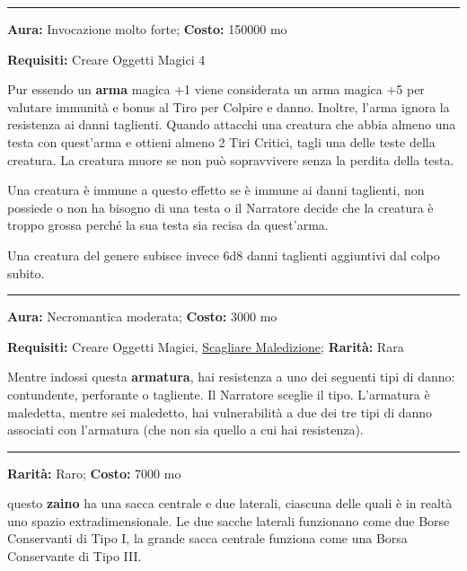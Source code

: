 \begin{multicols}{2}
\smallskip\noindent\rule{\linewidth}{2pt}  \hypertarget{Vorpal}{}\smallskip{}\noindent\label{Vorpal}

\textbf{Aura:} Invocazione molto forte; \textbf{Costo:} 150000 mo

\textbf{Requisiti:} Creare Oggetti Magici 4

Pur essendo un \textbf{arma} magica +1 viene considerata un arma magica +5 per valutare immunità e bonus al Tiro per Colpire e danno. Inoltre, l'arma ignora la resistenza ai danni taglienti. Quando attacchi una creatura che abbia almeno una testa con quest'arma e ottieni almeno 2 Tiri Critici, tagli una delle teste della creatura. La creatura muore se non può sopravvivere senza la perdita della testa.

Una creatura è immune a questo effetto se è immune ai danni taglienti, non possiede o non ha bisogno di una testa o il Narratore decide che la creatura è troppo grossa perché la sua testa sia recisa da quest'arma.

Una creatura del genere subisce invece 6d8 danni taglienti aggiuntivi dal colpo subito.

\smallskip\noindent\rule{\linewidth}{2pt}  \hypertarget{Vulnerabilità}{}\smallskip{}\noindent\label{Vulnerabilità}

\textbf{Aura:} Necromantica moderata; \textbf{Costo:} 3000 mo

\textbf{Requisiti:} Creare Oggetti Magici, \hyperlink{Scagliare Maledizione}{Scagliare Maledizione}; \textbf{Rarità:} Rara

Mentre indossi questa \textbf{armatura}, hai resistenza a uno dei seguenti tipi di danno: contundente, perforante o tagliente. Il Narratore sceglie il tipo. L'armatura è maledetta, mentre sei maledetto, hai vulnerabilità a due dei tre tipi di danno associati con l'armatura (che non sia quello a cui hai resistenza).

\smallskip\noindent\rule{\linewidth}{2pt}  \hypertarget{ZainettoPratico}{}\smallskip{}\noindent\label{ZainettoPratico}

\textbf{Rarità:} Raro; \textbf{Costo:} 7000 mo

questo \textbf{zaino} ha una sacca centrale e due laterali, ciascuna delle quali è in realtà uno spazio extradimensionale.
Le due sacche laterali funzionano come due Borse Conservanti di Tipo I, la grande sacca centrale funziona come una Borsa Conservante di Tipo III.


\end{multicols}
